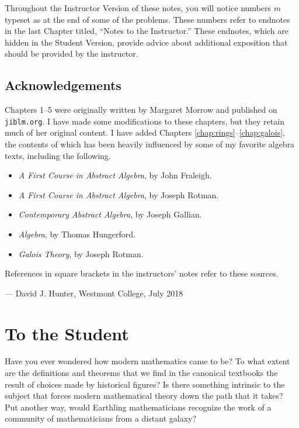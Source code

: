 \begin{annotation}
Throughout the Instructor Version of these notes, you will notice numbers $m$ typeset as  at the end of some of the problems. These numbers refer to endnotes in the last Chapter titled, ``Notes to the Instructor.'' These endnotes, which are hidden in the Student Version, provide advice about additional exposition that should be provided by the instructor.

\section*{Acknowledgements}

Chapters 1--5 were originally written by Margaret Morrow and published on \texttt{jiblm.org}. I have made some modifications to these chapters, but they retain much of her original content. I have added Chapters \ref{chap:rings}--\ref{chap:galois}, the contents of which has been heavily influenced by some of my favorite algebra texts, including the following.
\begin{itemize}
    \item \textit{A First Course in Abstract Algebra}, by John Fraleigh.
    \item \textit{A First Course in Abstract Algebra}, by Joseph Rotman.
    \item \textit{Contemporary Abstract Algebra}, by Joseph Gallian.
    \item \textit{Algebra}, by Thomas Hungerford.
    \item \textit{Galois Theory}, by Joseph Rotman.
\end{itemize}

References in square brackets in the instructors' notes refer to these sources.

\begin{flushright}
--- David J. Hunter, Westmont College, July 2018
\end{flushright}

\end{annotation}



\chapter{To the Student}

Have you ever wondered how modern mathematics came to be? To what extent are the definitions and theorems that we find in the canonical textbooks the result of choices made by historical figures? Is there something intrinsic to the subject that forces modern mathematical theory down the path that it takes? Put another way, would Earthling mathematicians recognize the work of a community of mathematicians from a distant galaxy?


